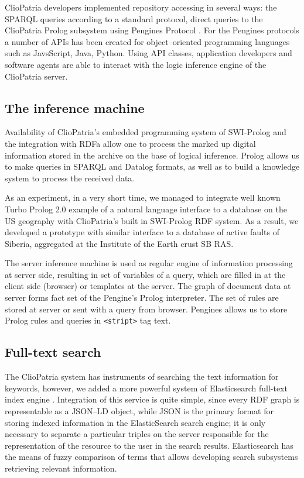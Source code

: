 \documentclass[conference,a4paper]{IEEEtran}
\begin{document}
ClioPatria developers implemented repository accessing in several ways: the SPARQL queries according to a standard protocol, direct queries to the ClioPatria Prolog subsystem using Pengines Protocol \cite{b9}.  For the Pengines protocols a number of APIs has been created for object--oriented programming languages such as JavsScript, Java, Python.  Using API classes, application developers and software agents are able to interact with the logic inference engine of the ClioPatria server.

\subsection{The inference machine}

Availability of ClioPatria's embedded programming system of SWI-Prolog \cite{b10} and the integration with RDFa allow one to process the marked up digital information stored in the archive on the base of logical inference.  Prolog allows us to make queries in SPARQL and Datalog formats, as well as to build a knowledge system to process the received data.

As an experiment, in a very short time, we managed to integrate well known Turbo Prolog 2.0 example of a natural language interface to a database on the US geography with ClioPatria's built in SWI-Prolog RDF system.  As a result, we developed a prototype with similar interface to a database of active faults of Siberia, aggregated at the Institute of the Earth crust SB RAS.

The server inference machine is used as regular engine of information processing at server side, resulting in set of variables of a query, which are filled in at the client side (browser) or templates at the server.  The graph of document data at server forms fact set of the Pengine's Prolog interpreter.  The set of rules are stored at server or sent with a query from browser.  Pengines allows us to store Prolog rules and queries in \texttt{<stript>} tag text.

\subsection{Full-text search}

The ClioPatria system has instruments of searching the text information for keywords, however, we added a more powerful system of Elasticsearch full-text index engine \cite{b13}.  Integration of this service is quite simple, since every RDF graph is representable as a JSON--LD object, while JSON is the primary format for storing indexed information in the ElasticSearch search engine; it is only necessary to separate a particular triples on the server responsible for the representation of the resource to the user in the search results.  Elasticsearch has the means of fuzzy comparison of terms that allows developing search subsystems retrieving relevant information.
\end{document}
